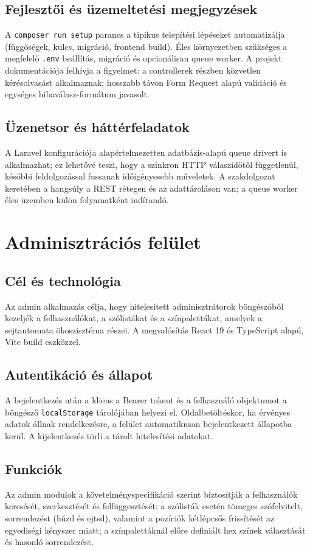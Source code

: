 \documentclass[12pt,a4paper,openany]{book}
\begin{document}
\section{Fejlesztői és üzemeltetési megjegyzések}
A \texttt{composer run setup} parancs a tipikus telepítési lépéseket automatizálja (függőségek, kulcs, migráció, frontend build). Éles környezetben szükséges a megfelelő \texttt{.env} beállítás, migráció és opcionálisan queue worker. A projekt dokumentációja felhívja a figyelmet: a controllerek részben közvetlen kérésolvasást alkalmaznak; hosszabb távon Form Request alapú validáció és egységes hibaválasz-formátum javasolt.

\section{Üzenetsor és háttérfeladatok}
A Laravel konfigurációja alapértelmezetten adatbázis-alapú queue drivert is alkalmazhat; ez lehetővé teszi, hogy a szinkron HTTP válaszidőtől függetlenül, későbbi feldolgozással fussanak időigényesebb műveletek. A szakdolgozat keretében a hangsúly a REST rétegen és az adattároláson van; a queue worker éles üzemben külön folyamatként indítandó.

\chapter{Adminisztrációs felület}
\label{ch:admin}

\section{Cél és technológia}
Az admin alkalmazás célja, hogy hitelesített adminisztrátorok böngészőből kezeljék a felhasználókat, a szólistákat és a színpalettákat, amelyek a sejtautomata ökoszisztéma részei. A megvalósítás React 19 és TypeScript alapú, Vite build eszközzel.

\section{Autentikáció és állapot}
A bejelentkezés után a kliens a Bearer tokent és a felhasználó objektumot a böngésző \texttt{localStorage} tárolójában helyezi el. Oldalbetöltéskor, ha érvényes adatok állnak rendelkezésre, a felület automatikusan bejelentkezett állapotba kerül. A kijelentkezés törli a tárolt hitelesítési adatokat.

\section{Funkciók}
Az admin modulok a követelményspecifikáció szerint biztosítják a felhasználók keresését, szerkesztését és felfüggesztését; a szólisták esetén tömeges szófelvitelt, sorrendezést (húzd és ejtsd), valamint a pozíciók kétlépcsős frissítését az egyediségi kényszer miatt; a színpalettáknál előre definiált hex színek választását és hasonló sorrendezést.
\end{document}
